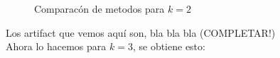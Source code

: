 \begin{figure}[H]
    \centering
    \qquad
    \qquad
    \caption{Comparacón de metodos para $k = 2$}%
    \label{fig:example}%
\end{figure}

Los artifact que vemos aquí son, bla bla bla (COMPLETAR!)
\\
Ahora lo hacemos para $k=3$, se obtiene esto:

